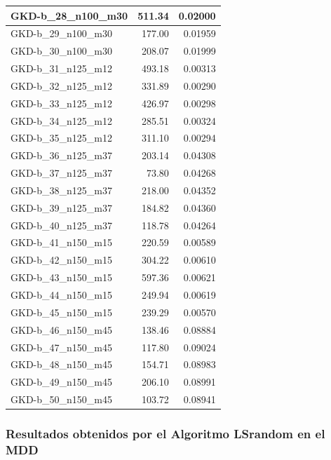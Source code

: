 \documentclass{article}
\begin{document}
\begin{table}[ht]
\begin{tabular}{|l|r|r|}
GKD-b\_28\_n100\_m30 & 511.34 & 0.02000 \\ \hline
GKD-b\_29\_n100\_m30 & 177.00 & 0.01959 \\ \hline
GKD-b\_30\_n100\_m30 & 208.07 & 0.01999 \\ \hline
GKD-b\_31\_n125\_m12 & 493.18 & 0.00313 \\ \hline
GKD-b\_32\_n125\_m12 & 331.89 & 0.00290 \\ \hline
GKD-b\_33\_n125\_m12 & 426.97 & 0.00298 \\ \hline
GKD-b\_34\_n125\_m12 & 285.51 & 0.00324 \\ \hline
GKD-b\_35\_n125\_m12 & 311.10 & 0.00294 \\ \hline
GKD-b\_36\_n125\_m37 & 203.14 & 0.04308 \\ \hline
GKD-b\_37\_n125\_m37 & 73.80 & 0.04268 \\ \hline
GKD-b\_38\_n125\_m37 & 218.00 & 0.04352 \\ \hline
GKD-b\_39\_n125\_m37 & 184.82 & 0.04360 \\ \hline
GKD-b\_40\_n125\_m37 & 118.78 & 0.04264 \\ \hline
GKD-b\_41\_n150\_m15 & 220.59 & 0.00589 \\ \hline
GKD-b\_42\_n150\_m15 & 304.22 & 0.00610 \\ \hline
GKD-b\_43\_n150\_m15 & 597.36 & 0.00621 \\ \hline
GKD-b\_44\_n150\_m15 & 249.94 & 0.00619 \\ \hline
GKD-b\_45\_n150\_m15 & 239.29 & 0.00570 \\ \hline
GKD-b\_46\_n150\_m45 & 138.46 & 0.08884 \\ \hline
GKD-b\_47\_n150\_m45 & 117.80 & 0.09024 \\ \hline
GKD-b\_48\_n150\_m45 & 154.71 & 0.08983 \\ \hline
GKD-b\_49\_n150\_m45 & 206.10 & 0.08991 \\ \hline
GKD-b\_50\_n150\_m45 & 103.72 & 0.08941 \\ \hline
\end{tabular}
\end{table}

\newpage
\subsubsection{Resultados obtenidos por el Algoritmo LSrandom en el MDD}
\end{document}
